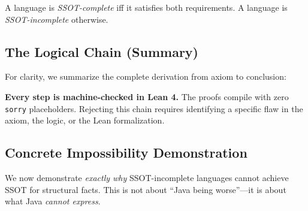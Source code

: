 \begin{corollary}\label{cor:ssot-complete}
A language is \emph{SSOT-complete} iff it satisfies both requirements. A language is \emph{SSOT-incomplete} otherwise.
\end{corollary}

\subsection{The Logical Chain (Summary)}\label{sec:chain}

For clarity, we summarize the complete derivation from axiom to conclusion:

\begin{center}
\end{center}

\textbf{Every step is machine-checked in Lean 4.} The proofs compile with zero \texttt{sorry} placeholders. Rejecting this chain requires identifying a specific flaw in the axiom, the logic, or the Lean formalization.

\subsection{Concrete Impossibility Demonstration}\label{sec:impossibility}

We now demonstrate \emph{exactly why} SSOT-incomplete languages cannot achieve SSOT for structural facts. This is not about ``Java being worse''---it is about what Java \emph{cannot express}.

